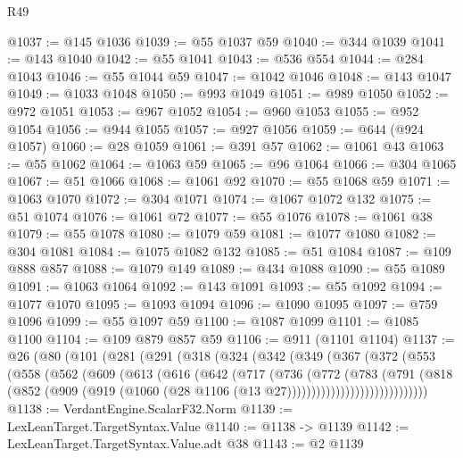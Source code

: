 \begin{lexlean}{R49}
\begin{coremodule}
@1037 := @145 @1036
@1039 := @55 @1037 @59
@1040 := @344 @1039
@1041 := @143 @1040
@1042 := @55 @1041
@1043 := @536 @554
@1044 := @284 @1043
@1046 := @55 @1044 @59
@1047 := @1042 @1046
@1048 := @143 @1047
@1049 := @1033 @1048
@1050 := @993 @1049
@1051 := @989 @1050
@1052 := @972 @1051
@1053 := @967 @1052
@1054 := @960 @1053
@1055 := @952 @1054
@1056 := @944 @1055
@1057 := @927 @1056
@1059 := @644 (@924 @1057)
@1060 := @28 @1059
@1061 := @391 @57
@1062 := @1061 @43
@1063 := @55 @1062
@1064 := @1063 @59
@1065 := @96 @1064
@1066 := @304 @1065
@1067 := @51 @1066
@1068 := @1061 @92
@1070 := @55 @1068 @59
@1071 := @1063 @1070
@1072 := @304 @1071
@1074 := @1067 @1072 @132
@1075 := @51 @1074
@1076 := @1061 @72
@1077 := @55 @1076
@1078 := @1061 @38
@1079 := @55 @1078
@1080 := @1079 @59
@1081 := @1077 @1080
@1082 := @304 @1081
@1084 := @1075 @1082 @132
@1085 := @51 @1084
@1087 := @109 @888 @857
@1088 := @1079 @149
@1089 := @434 @1088
@1090 := @55 @1089
@1091 := @1063 @1064
@1092 := @143 @1091
@1093 := @55 @1092
@1094 := @1077 @1070
@1095 := @1093 @1094
@1096 := @1090 @1095
@1097 := @759 @1096
@1099 := @55 @1097 @59
@1100 := @1087 @1099
@1101 := @1085 @1100
@1104 := @109 @879 @857 @59
@1106 := @911 (@1101 @1104)
@1137 := @26
    (@80
      (@101
        (@281
          (@291
            (@318
              (@324
                (@342
                  (@349
                    (@367
                      (@372
                        (@553
                          (@558
                            (@562
                              (@609
                                (@613
                                  (@616
                                    (@642
                                      (@717
                                        (@736
                                          (@772
                                            (@783
                                              (@791
                                                (@818
                                                  (@852
                                                    (@909
                                                      (@919
                                                        (@1060
                                                          (@28
                                                            @1106
                                                            (@13 @27)))))))))))))))))))))))))))))
@1138 := VerdantEngine.ScalarF32.Norm
@1139 := LexLeanTarget.TargetSyntax.Value
@1140 := @1138 -> @1139
@1142 := LexLeanTarget.TargetSyntax.Value.adt @38
@1143 := @2 @1139

\end{coremodule}
\end{lexlean}
